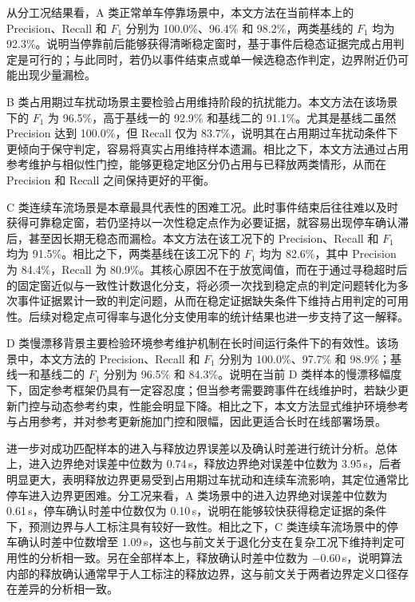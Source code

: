 \documentclass{xdupgthesis}
\begin{document}
从分工况结果看，A 类正常单车停靠场景中，本文方法在当前样本上的 Precision、Recall 和 $F_1$ 分别为 100.0\%、96.4\% 和 98.2\%，两类基线的 $F_1$ 均为 92.3\%。说明当停靠前后能够获得清晰稳定窗时，基于事件后稳态证据完成占用判定是可行的；与此同时，若仍以事件结束点或单一候选稳态作判定，边界附近仍可能出现少量漏检。

B 类占用期过车扰动场景主要检验占用维持阶段的抗扰能力。本文方法在该场景下的 $F_1$ 为 96.5\%，高于基线一的 92.9\% 和基线二的 91.1\%。尤其是基线二虽然 Precision 达到 100.0\%，但 Recall 仅为 83.7\%，说明其在占用期过车扰动条件下更倾向于保守判定，容易将真实占用维持样本遗漏。相比之下，本文方法通过占用参考维护与相似性门控，能够更稳定地区分仍占用与已释放两类情形，从而在 Precision 和 Recall 之间保持更好的平衡。

C 类连续车流场景是本章最具代表性的困难工况。此时事件结束后往往难以及时获得可靠稳定窗，若仍坚持以一次性稳定点作为必要证据，就容易出现停车确认滞后，甚至因长期无稳态而漏检。本文方法在该工况下的 Precision、Recall 和 $F_1$ 均为 91.5\%。相比之下，两类基线在该工况下的 $F_1$ 均为 82.6\%，其中 Precision 为 84.4\%，Recall 为 80.9\%。其核心原因不在于放宽阈值，而在于通过寻稳超时后的固定窗近似与一致性计数退化分支，将必须一次找到稳定点的判定问题转化为多次事件证据累计一致的判定问题，从而在稳定证据缺失条件下维持占用判定的可用性。后续对稳定点可得率与退化分支使用率的统计结果也进一步支持了这一解释。

D 类慢漂移背景主要检验环境参考维护机制在长时间运行条件下的有效性。该场景中，本文方法的 Precision、Recall 和 $F_1$ 分别为 100.0\%、97.7\% 和 98.9\%；基线一和基线二的 $F_1$ 分别为 96.5\% 和 84.3\%。说明在当前 D 类样本的慢漂移幅度下，固定参考框架仍具有一定容忍度；但当参考需要跨事件在线维护时，若缺少更新门控与动态参考约束，性能会明显下降。相比之下，本文方法显式维护环境参考与占用参考，并对参考更新施加门控和限幅，因此更适合长时在线部署场景。

进一步对成功匹配样本的进入与释放边界误差以及确认时差进行统计分析。总体上，进入边界绝对误差中位数为 0.74\,s，释放边界绝对误差中位数为 3.95\,s，后者明显更大，表明释放边界更易受到占用期过车扰动和连续车流影响，其定位通常比停车进入边界更困难。分工况来看，A 类场景中的进入边界绝对误差中位数为 0.61\,s，停车确认时差中位数仅为 0.10\,s，说明在能够较快获得稳定证据的条件下，预测边界与人工标注具有较好一致性。相比之下，C 类连续车流场景中的停车确认时差中位数增至 1.09\,s，这也与前文关于退化分支在复杂工况下维持判定可用性的分析相一致。另在全部样本上，释放确认时差中位数为 $-0.60$\,s，说明算法内部的释放确认通常早于人工标注的释放边界，这与前文关于两者边界定义口径存在差异的分析相一致。
\end{document}
